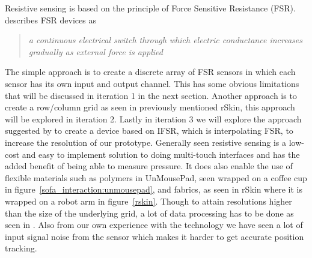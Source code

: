 Resistive sensing is based on the principle of Force Sensitive Resistance (FSR). 
\citet{rosenberg2009unmousepad} describes FSR devices as 
\begin{quotation}
\emph{a continuous electrical switch through which electric conductance increases gradually as external force is applied}
\end{quotation}
The simple approach is to create a discrete array of FSR sensors in which each sensor has its own input and output channel.
This has some obvious limitations that will be discussed in iteration 1 in the next section.
Another approach is to create a row/column grid as seen in previously mentioned rSkin, this approach will be explored in iteration 2.
Lastly in iteration 3 we will explore the approach suggested by \citet{rosenberg2009unmousepad} to create a device based on IFSR, which is interpolating FSR, to increase the resolution of our prototype.
Generally seen resistive sensing is a low-cost and easy to implement solution to doing multi-touch interfaces and has the added benefit of being able to measure pressure.
It does also enable the use of flexible materials such as polymers in UnMousePad, seen wrapped on a coffee cup in figure~\ref{sofa_interaction:unmousepad}, and fabrics, as seen in rSkin where it is wrapped on a robot arm in figure~\ref{rskin}.
Though to attain resolutions higher than the size of the underlying grid, a lot of data processing has to be done as seen in \citep{rosenberg2009unmousepad}.
Also from our own experience with the technology we have seen a lot of input signal noise from the sensor which makes it harder to get accurate position tracking.   

